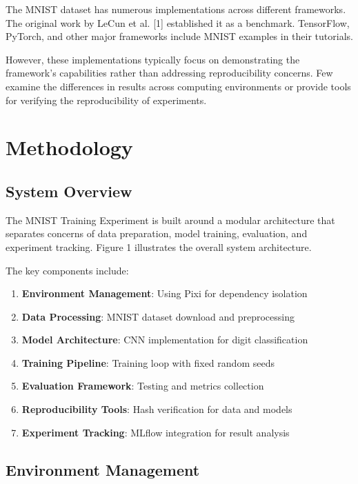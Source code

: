 \documentclass[
]{article}
\providecommand{\tightlist}{%
  \setlength{\itemsep}{0pt}\setlength{\parskip}{0pt}}\usepackage{longtable,booktabs,array}
\begin{document}
The MNIST dataset has numerous implementations across different
frameworks. The original work by LeCun et al. {[}1{]} established it as
a benchmark. TensorFlow, PyTorch, and other major frameworks include
MNIST examples in their tutorials.

However, these implementations typically focus on demonstrating the
framework's capabilities rather than addressing reproducibility
concerns. Few examine the differences in results across computing
environments or provide tools for verifying the reproducibility of
experiments.

\section{Methodology}\label{sec-methodology}

\subsection{System Overview}\label{system-overview}

The MNIST Training Experiment is built around a modular architecture
that separates concerns of data preparation, model training, evaluation,
and experiment tracking. Figure 1 illustrates the overall system
architecture.

The key components include:

\begin{enumerate}
\def\labelenumi{\arabic{enumi}.}
\tightlist
\item
  \textbf{Environment Management}: Using Pixi for dependency isolation
\item
  \textbf{Data Processing}: MNIST dataset download and preprocessing
\item
  \textbf{Model Architecture}: CNN implementation for digit
  classification
\item
  \textbf{Training Pipeline}: Training loop with fixed random seeds
\item
  \textbf{Evaluation Framework}: Testing and metrics collection
\item
  \textbf{Reproducibility Tools}: Hash verification for data and models
\item
  \textbf{Experiment Tracking}: MLflow integration for result analysis
\end{enumerate}

\subsection{Environment Management}\label{environment-management}
\end{document}
